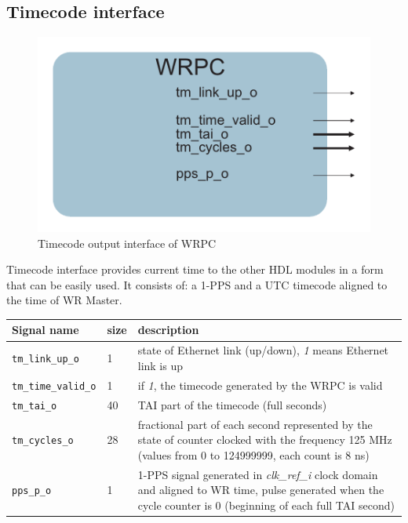 \subsection{Timecode interface}

\begin{figure}[ht]
  \begin{center}
    \includegraphics[width=.5\textwidth]{fig/basic_wrpc_tm.pdf}
    \caption{Timecode output interface of WRPC}
  \end{center}
\end{figure}

Timecode interface provides current time to the other HDL modules in a form that
can be easily used. It consists of: a 1-PPS and a UTC timecode
aligned to the time of WR Master.
\begin{center}
  \begin{tabular}{|l|l|p{10cm}|}
    \hline
    {\bf Signal name} & {\bf size} & {\bf description} \\
    \hline \hline
    \texttt{tm\_link\_up\_o} & 1 & state of Ethernet link (up/down), \emph{1}
    means Ethernet link is up\\
    \texttt{tm\_time\_valid\_o} & 1 & if \emph{1}, the timecode generated by the
    WRPC is valid\\
    \texttt{tm\_tai\_o} & 40 & TAI part of the timecode (full seconds)\\
    \texttt{tm\_cycles\_o} & 28 & fractional part of each second represented by
    the state of counter clocked with the frequency 125 MHz (values from 0 to
    124999999, each count is 8 ns)\\
    \texttt{pps\_p\_o} & 1 & 1-PPS signal generated in \emph{clk\_ref\_i} clock
    domain and aligned to WR time, pulse
    generated when the cycle counter is 0 (beginning of each full TAI second)\\
    \hline
  \end{tabular}
\end{center}
